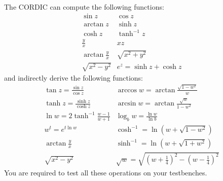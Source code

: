\documentclass[a4paper,12pt,twoside]{article}
\begin{document}
The CORDIC can compute the following functions:
\begin{equation}
\begin{array}{cc}
    \sin{z} & \cos{z} \\
    \arctan{z} & \sinh{z} \\
    \cosh{z} & \tanh^{-1}{z} \\
    \frac{y}{x} & xz \\
    \arctan{\frac{y}{x}} & \sqrt{x^2+y^2} \\
    \sqrt{x^2-y^2} & e^z=\sinh{z}+\cosh{z}
\end{array}
\end{equation}
and indirectly derive the following functions:
\begin{equation}
\begin{array}{cc}
    \tan{z}=\frac{\sin{z}}{\cos{z}} & \arccos{w}=\arctan{\frac{\sqrt{1-w^2}}{w}} \\
    \tanh{z}=\frac{\sinh{z}}{\cosh{z}} & \arcsin{w}=\arctan{\frac{\sqrt{w}}{1-w^2}} \\
    \ln{w}=2\tanh^{-1}{\frac{w-1}{w+1}} & \log_bw=\frac{\ln{w}}{\ln{b}} \\
    w^t=e^{t\ln{w}} & \cosh^{-1}=\ln{(w+\sqrt{1-w^2})} \\
    \arctan{\frac{y}{x}} & \sinh^{-1}=\ln{(w+\sqrt{1+w^2})} \\
    \sqrt{x^2-y^2} & \sqrt{w}=\sqrt{(w+\frac{1}{4})^2-(w-\frac{1}{4})^2}
\end{array}
\end{equation}
You are required to test all these operations on your testbenches.
\end{document}
